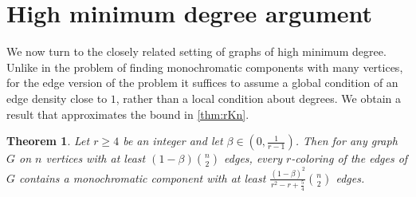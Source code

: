 \documentclass[12pt]{amsart}
\newtheorem{theorem}{Theorem}[section]
\theoremstyle{definition}
\numberwithin{equation}{section}
\begin{document}
\section{High minimum degree argument}
We now turn to the closely related setting of graphs of high minimum degree. Unlike in the problem of finding monochromatic components with many vertices, for the edge version of the problem it suffices to assume a global condition of an edge density close to $1$, rather than a local condition about degrees. We obtain a result that approximates the bound in \cref{thm:rKn}.
\label{sec:mindeg}
\begin{theorem}
    Let $r\ge 4$ be an integer and let $\beta\in (0,\frac{1}{r-1})$. Then for any graph $G$ on $n$ vertices with at least $(1-\beta){n\choose 2}$ edges, every $r$-coloring of the edges of $G$ contains a monochromatic component with at least
    $\frac{(1-\beta)^2}{r^2-r+\frac{5}{4}}\binom{n}{2}$
    edges.
\end{theorem}
\end{document}
